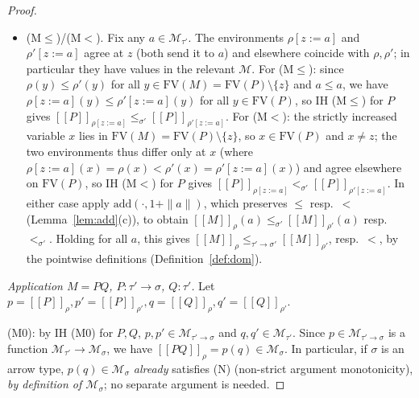 \documentclass{amsart}
\theoremstyle{definition}
\newcommand{\interp}[1]{[\![#1]\!]}
\newcommand{\FV}{\mathrm{FV}}
\begin{document}
\begin{proof}
\begin{itemize}
  \emph{(N).} Fix $a\le_{\tau'}a'$. By IH \textup{(M$\le$)} for $P$,
  $\interp{P}_{\rho[z:=a]}\le_{\sigma'}\interp{P}_{\rho[z:=a']}$; and $\|a\|\le\|a'\|$
  (Lemma~\ref{lem:basic}(b)), so $1{+}\|a\|\le 1{+}\|a'\|$. Then by Lemma~\ref{lem:add}(c)
  (value side, $\le$) and the shift-side non-strict monotonicity
  $k\le k'\Rightarrow\mathrm{add}(v,k)\le\mathrm{add}(v,k')$ (Lemma~\ref{lem:add}(d)),
  composed by transitivity of $\le$,
  \[
    \interp{M}_\rho(a)=\mathrm{add}(\interp{P}_{\rho[z:=a]},1{+}\|a\|)
    \le_{\sigma'}\mathrm{add}(\interp{P}_{\rho[z:=a']},1{+}\|a'\|)=\interp{M}_\rho(a').
  \]
  Thus $\interp{M}_\rho\in\mathcal M_{\tau'\to\sigma'}$.
\item (M$\le$)/(M$<$). Fix any $a\in\mathcal M_{\tau'}$. The environments $\rho[z:=a]$ and
  $\rho'[z:=a]$ agree at $z$ (both send it to $a$) and elsewhere coincide with $\rho,\rho'$;
  in particular they have values in the relevant $\mathcal M$. For (M$\le$): since
  $\rho(y)\le\rho'(y)$ for all $y\in\FV(M)=\FV(P)\setminus\{z\}$ and $a\le a$, we have
  $\rho[z:=a](y)\le\rho'[z:=a](y)$ for all $y\in\FV(P)$, so IH \textup{(M$\le$)} for $P$ gives
  $\interp{P}_{\rho[z:=a]}\le_{\sigma'}\interp{P}_{\rho'[z:=a]}$. For (M$<$): the strictly
  increased variable $x$ lies in $\FV(M)=\FV(P)\setminus\{z\}$, so $x\in\FV(P)$ and $x\ne z$;
  the two environments thus differ only at $x$ (where $\rho[z:=a](x)=\rho(x)<\rho'(x)=
  \rho'[z:=a](x)$) and agree elsewhere on $\FV(P)$, so IH \textup{(M$<$)} for $P$ gives
  $\interp{P}_{\rho[z:=a]}<_{\sigma'}\interp{P}_{\rho'[z:=a]}$. In either case apply
  $\mathrm{add}(\cdot,1{+}\|a\|)$, which preserves $\le$ resp.\ $<$ (Lemma~\ref{lem:add}(c)),
  to obtain $\interp{M}_\rho(a)\le_{\sigma'}\interp{M}_{\rho'}(a)$ resp.\ $<_{\sigma'}$.
  Holding for all $a$, this gives $\interp{M}_\rho\le_{\tau'\to\sigma'}\interp{M}_{\rho'}$,
  resp.\ $<$, by the pointwise definitions (Definition~\ref{def:dom}).
\end{itemize}

\medskip\noindent\emph{Application $M=PQ$, $P:\tau'\to\sigma$, $Q:\tau'$.}
Let $p=\interp{P}_\rho,p'=\interp{P}_{\rho'},q=\interp{Q}_\rho,q'=\interp{Q}_{\rho'}$.

(M0): by IH \textup{(M0)} for $P,Q$, $p,p'\in\mathcal M_{\tau'\to\sigma}$ and
$q,q'\in\mathcal M_{\tau'}$. Since $p\in\mathcal M_{\tau'\to\sigma}$ is a function
$\mathcal M_{\tau'}\to\mathcal M_\sigma$, we have $\interp{PQ}_\rho=p(q)\in\mathcal M_\sigma$.
In particular, if $\sigma$ is an arrow type, $p(q)\in\mathcal M_\sigma$ \emph{already}
satisfies (N) (non-strict argument monotonicity), \emph{by definition of $\mathcal M_\sigma$};
no separate argument is needed.


\end{proof}
\end{document}
